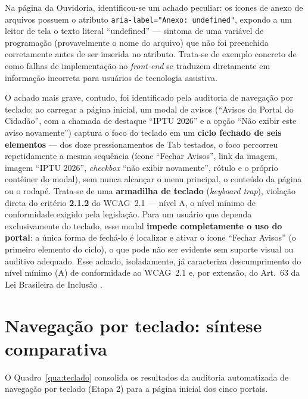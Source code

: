 \documentclass[brazil]{ifpr-pinhais}
\begin{document}
Na página da Ouvidoria, identificou-se um achado peculiar: os ícones de anexo de arquivos possuem o atributo \texttt{aria-label="Anexo: undefined"}, expondo a um leitor de tela o texto literal ``undefined'' --- sintoma de uma variável de programação (provavelmente o nome do arquivo) que não foi preenchida corretamente antes de ser inserida no atributo. Trata-se de exemplo concreto de como falhas de implementação no \textit{front-end} se traduzem diretamente em informação incorreta para usuários de tecnologia assistiva.

O achado mais grave, contudo, foi identificado pela auditoria de navegação por teclado: ao carregar a página inicial, um modal de avisos (``Avisos do Portal do Cidadão'', com a chamada de destaque ``IPTU 2026'' e a opção ``Não exibir este aviso novamente'') captura o foco do teclado em um \textbf{ciclo fechado de seis elementos} --- dos doze pressionamentos de Tab testados, o foco percorreu repetidamente a mesma sequência (ícone ``Fechar Avisos'', link da imagem, imagem ``IPTU 2026'', \textit{checkbox} ``não exibir novamente'', rótulo e o próprio contêiner do modal), sem nunca alcançar o menu principal, o conteúdo da página ou o rodapé. Trata-se de uma \textbf{armadilha de teclado} (\textit{keyboard trap}), violação direta do critério \textbf{2.1.2} do WCAG~2.1 --- nível A, o nível mínimo de conformidade exigido pela legislação. Para um usuário que dependa exclusivamente do teclado, esse modal \textbf{impede completamente o uso do portal}: a única forma de fechá-lo é localizar e ativar o ícone ``Fechar Avisos'' (o primeiro elemento do ciclo), o que pode não ser evidente sem suporte visual ou auditivo adequado. Esse achado, isoladamente, já caracteriza descumprimento do nível mínimo (A) de conformidade ao WCAG~2.1 e, por extensão, do Art.~63 da Lei Brasileira de Inclusão \cite{brasil2015lbi}.

\section{Navegação por teclado: síntese comparativa}

O Quadro~\ref{qua:teclado} consolida os resultados da auditoria automatizada de navegação por teclado (Etapa 2) para a página inicial dos cinco portais.
\end{document}
